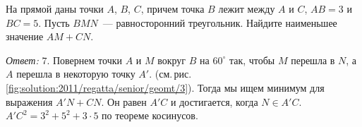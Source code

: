 \problem
На прямой даны точки $A$, $B$, $C$, причем точка $B$ лежит между $A$ и $C$, $AB = 3$ и $BC = 5$.
Пусть $BMN$~--- равносторонний треугольник.
Найдите наименьшее значение $AM + CN$.


%
\label{solution:2011/regatta/senior/geomt/3}%
\emph{Ответ:} $7$.
Повернем точки $A$ и $M$ вокруг $B$ на $60^\circ$ так, чтобы $M$ перешла в $N$,
а $A$ перешла в некоторую точку $A'$.
(см.\,рис.\,\ref{fig:solution:2011/regatta/senior/geomt/3}).
Тогда мы ищем минимум для выражения $A'N + CN$.
Он равен $A'C$ и достигается, когда $N \in A'C$.
$A'C^2 = 3^2 + 5^2 + 3 \cdot 5$ по теореме косинусов.


\endproblem
